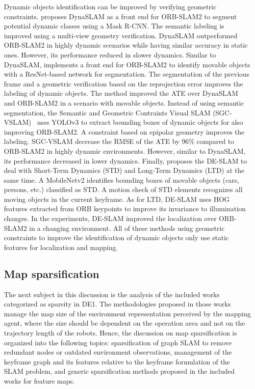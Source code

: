 Dynamic objects identification can be improved by verifying geometric constraints.
\cite{bescos-et-al:2018:2860039} proposes DynaSLAM as a front end for ORB-SLAM2 to segment potential dynamic classes using a Mask R-CNN. The semantic labeling is improved using a multi-view geometry verification. DynaSLAM outperformed ORB-SLAM2 in highly dynamic scenarios while having similar accuracy in static ones. However, its performance reduced in slower dynamics.
Similar to DynaSLAM, \cite{wang-et-al:2019:8793499} implements a front end for ORB-SLAM2 to identify movable objects with a ResNet-based network for segmentation. The segmentation of the previous frame and a geometric verification based on the reprojection error improves the labeling of dynamic objects. The method improved the ATE over DynaSLAM and ORB-SLAM2 in a scenario with movable objects.
Instead of using semantic segmentation, the Semantic and Geometric Contraints Visual SLAM (SGC-VSLAM)~\parencite{yang-et-al:2020:s20082432} uses YOLOv3 to extract bounding boxes of dynamic objects for also improving ORB-SLAM2. A constraint based on epipolar geometry improves the labeling. SGC-VSLAM decrease the RMSE of the ATE by 96\% compared to ORB-SLAM2 in highly dynamic environments. However, similar to DynaSLAM, its performance decreased in lower dynamics.
Finally, \cite{xing-et-al:2022:22062} proposes the DE-SLAM to deal with Short-Term Dynamics (STD) and Long-Term Dynamics (LTD) at the same time. A MobileNetv2 identifies bounding boxes of movable objects (cars, persons, etc.) classified as STD. A motion check of STD elements recognizes all moving objects in the current keyframe. As for LTD, DE-SLAM uses HOG features extracted from ORB keypoints to improve its invariance to illumination changes. In the experiments, DE-SLAM improved the localization over ORB-SLAM2 in a changing environment.
All of these methods using geometric constraints to improve the identification of dynamic objects only use static features for localization and mapping.





\subsection{Map sparsification}
\label{sec:discussion:sparsity}

The next subject in this discussion is the analysis of the included works categorized as sparsity in DE1. The methodologies proposed in those works manage the map size of the environment representation perceived by the mapping agent, where the size should be dependent on the operation area and not on the trajectory length of the robots.
Hence, the discussion on map sparsification is organized into the following topics: sparsification of graph SLAM to remove redundant nodes or outdated environment observations, management of the keyframe graph and its features relative to the keyframe formulation of the SLAM problem, and generic sparsification methods proposed in the included works for feature maps.



